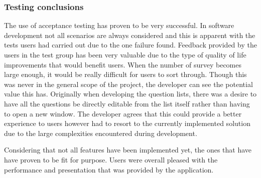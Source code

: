 \subsubsection*{Testing conclusions}
The use of acceptance testing has proven to be very successful.
In software development not all scenarios are always considered and this is apparent with the tests users had carried out due to the one failure 
found.
Feedback provided by the users in the test group has been very valuable due to the type of quality of life improvements that would benefit users.
When the number of survey becomes large enough, it would be really difficult for users to sort through. 
Though this was never in the general scope of the project, the developer can see the potential value this has.
Originally when developing the question lists, there was a desire to have all the questions be directly editable from the list itself rather than
having to open a new window. 
The developer agrees that this could provide a better experience to users however had to resort to the currently implemented solution due to the 
large complexities encountered during development.

Considering that not all features have been implemented yet, the ones that have have proven to be fit for purpose.
Users were overall pleased with the performance and presentation that was provided by the application.
